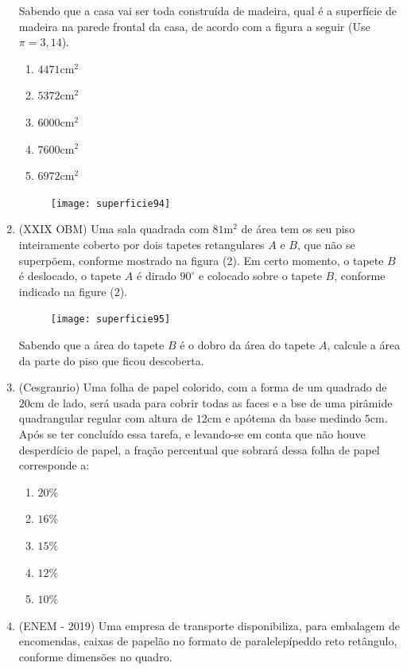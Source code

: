 \begin{enumerate}
  Sabendo que a casa vai ser toda construída de madeira, qual é a superfície de madeira na parede frontal da casa, de acordo com a figura a seguir (Use $\pi=3{,}14$).
  \begin{multicols}{2}
   \begin{enumerate}
    \item $4471\text{cm}^2$
    \item $5372\text{cm}^2$
    \item $6000\text{cm}^2$
    \item $7600\text{cm}^2$
    \item $6972\text{cm}^2$
  \end{enumerate}
  \begin{figure}[H]
  \centering

  \texttt{[image: superficie94]}
  \end{figure}
  \end{multicols}

  \item (XXIX OBM) Uma sala quadrada com $81\text{m}^2$ de área tem os seu piso inteiramente coberto por dois tapetes retangulares $A$ e $B$, que não se superpõem, conforme mostrado na figura (2). Em certo momento, o tapete $B$ é deslocado, o tapete $A$ é dirado $90^{\circ}$ e colocado sobre o tapete $B$, conforme indicado na figure (2).

  \begin{figure}[H]
  \centering

  \texttt{[image: superficie95]}
  \end{figure}

  Sabendo que a área do tapete $B$ é o dobro da área do tapete $A$, calcule a área da parte do piso que ficou descoberta.

  \item (Cesgranrio) Uma folha de papel colorido, com a forma de um quadrado de $20$cm de lado, será usada para cobrir todas as faces e a bse de uma pirâmide quadrangular regular com altura de $12$cm e apótema da base medindo $5$cm. Após se ter concluído essa tarefa, e levando-se em conta que não houve desperdício de papel, a fração percentual que sobrará dessa folha de papel corresponde a:
  \begin{enumerate}
    \item $20\%$
    \item $16\%$
    \item $15\%$
    \item $12\%$
    \item $10\%$
  \end{enumerate}
\clearpage
  \item (ENEM - 2019) Uma empresa de transporte disponibiliza, para embalagem de encomendas, caixas de papelão no formato de paralelepípeddo reto retângulo, conforme dimensões no quadro.


\end{enumerate}
